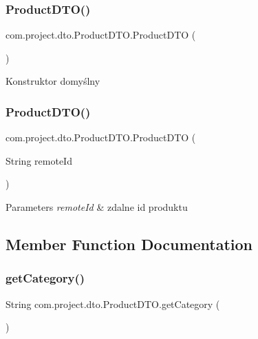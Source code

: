 \subsubsection{Product\+D\+T\+O()\hspace{0.1cm}{\footnotesize\ttfamily [1/2]}}
{\footnotesize\ttfamily com.\+project.\+dto.\+Product\+D\+T\+O.\+Product\+D\+TO (\begin{DoxyParamCaption}{ }\end{DoxyParamCaption})}

Konstruktor domyślny \mbox{\label{classcom_1_1project_1_1dto_1_1_product_d_t_o_ad5da33e2cdc64792ca4f6285c51c2ccc}} 
\subsubsection{Product\+D\+T\+O()\hspace{0.1cm}{\footnotesize\ttfamily [2/2]}}
{\footnotesize\ttfamily com.\+project.\+dto.\+Product\+D\+T\+O.\+Product\+D\+TO (\begin{DoxyParamCaption}\item[{String}]{remote\+Id }\end{DoxyParamCaption})}


\begin{DoxyParams}{Parameters}
{\em remote\+Id} & zdalne id produktu \\
\hline
\end{DoxyParams}


\subsection{Member Function Documentation}
\mbox{\label{classcom_1_1project_1_1dto_1_1_product_d_t_o_a23adcdd63df3545bb305456a880d39e3}} 
\subsubsection{get\+Category()}
{\footnotesize\ttfamily String com.\+project.\+dto.\+Product\+D\+T\+O.\+get\+Category (\begin{DoxyParamCaption}{ }\end{DoxyParamCaption})}

